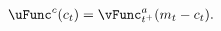   \begin{equation}\begin{gathered}\begin{aligned}
        \uFunc^{{c}}({c}_{\stge})   & = \vEndStget^{{a}}({m}_{\stge}-{c}_{\stge}).
        \label{eq:upEqbetaOp}
      \end{aligned}\end{gathered}\end{equation}
